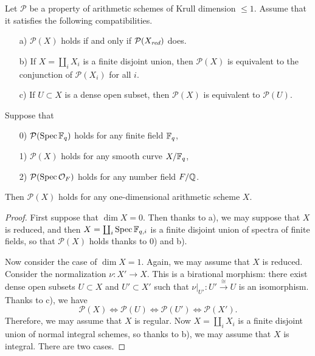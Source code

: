 \documentclass[draft]{article}
\numberwithin{equation}{section}
\begin{document}
\begin{lemma}
  \label{lemma:devissage}
  Let $\mathcal{P}$ be a property of arithmetic schemes of Krull dimension
  $\le 1$. Assume that it satisfies the following compatibilities.
  \begin{enumerate}
  \item[a)] $\mathcal{P} (X)$ holds if and only if $\mathcal{P} (X_{\text{\it red}})$ does.

  \item[b)] If $X = \coprod_i X_i$ is a finite disjoint union, then
    $\mathcal{P} (X)$ is equivalent to the conjunction of $\mathcal{P} (X_i)$ for
    all $i$.

  \item[c)] If $U \subset X$ is a dense open subset, then $\mathcal{P} (X)$
    is equivalent to $\mathcal{P} (U)$.
  \end{enumerate}
  Suppose that
  \begin{enumerate}
  \item[0)] $\mathcal{P} (\operatorname{Spec} \mathbb{F}_q)$ holds for any finite field $\mathbb{F}_q$,

  \item[1)] $\mathcal{P} (X)$ holds for any smooth curve $X/\mathbb{F}_q$,

  \item[2)] $\mathcal{P} (\operatorname{Spec} \mathcal{O}_F)$ holds for any number field
    $F/\mathbb{Q}$.
  \end{enumerate}
  Then $\mathcal{P} (X)$ holds for any one-dimensional arithmetic scheme $X$.

  \begin{proof}
    First suppose that $\dim X = 0$. Then thanks to a), we may suppose that $X$
    is reduced, and then $X = \coprod_i \operatorname{Spec} \mathbb{F}_{q,i}$ is a finite disjoint
    union of spectra of finite fields, so that $\mathcal{P} (X)$ holds thanks to
    0) and b).

    Now consider the case of $\dim X = 1$. Again, we may assume that $X$ is
    reduced. Consider the normalization $\nu\colon X' \to X$. This is a
    birational morphism: there exist dense open subsets $U \subset X$ and
    $U' \subset X'$ such that
    $\left.\nu\right|_{U'}\colon U' \xrightarrow{\cong} U$ is an
    isomorphism. Thanks to c), we have
    \[ \mathcal{P} (X) \iff
      \mathcal{P} (U) \iff
      \mathcal{P} (U') \iff
      \mathcal{P} (X'). \]
    Therefore, we may assume that $X$ is regular. Now $X = \coprod_i X_i$ is a
    finite disjoint union of normal integral schemes, so thanks to b), we may
    assume that $X$ is integral. There are two cases.


\end{proof}
\end{lemma}
\end{document}

